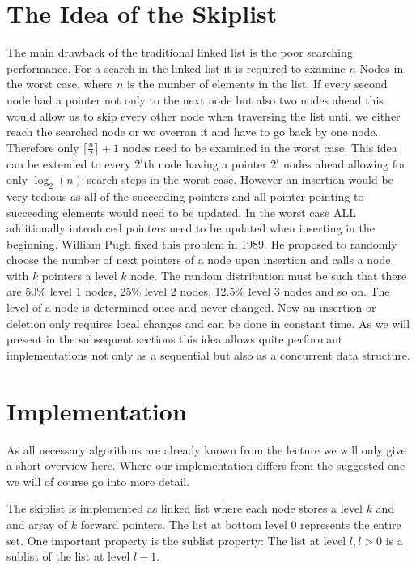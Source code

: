 \documentclass{article}
\begin{document}
\section{The Idea of the Skiplist}
The main drawback of the traditional linked list is the poor searching performance. For a search in the linked list it is required to examine $n$ Nodes in the worst case, where $n$ is the number of elements in the list. If every second node had a pointer not only to the next node but also two nodes ahead this would allow us to skip every other node when traversing the list until we either reach the searched node or we overran it and have to go back by one node. Therefore only \(\lceil \frac{n}{2}\rceil +1 \) nodes need to be examined in the worst case. This idea can be extended to every \(2^i\)th node having a pointer \(2^i\) nodes ahead allowing for only \(\log_2(n)\) search steps in the worst case. However an insertion would be very tedious as all of the succeeding pointers and all pointer pointing to succeeding elements would need to be updated. In the worst case ALL additionally introduced pointers need to be updated when inserting in the beginning. William Pugh fixed this problem in 1989. He proposed to randomly choose the number of next pointers of a node upon insertion and calls a node with $k$ pointers a level $k$ node. The random distribution must be such that there are 50\% level $1$ nodes, 25\% level $2$ nodes, 12.5\% level $3$ nodes and so on. The level of a node is determined once and never changed. Now an insertion or deletion only requires local changes and can be done in constant time. As we will present in the subsequent sections this idea allows quite performant implementations not only as a sequential but also as a concurrent data structure.

\section{Implementation}
As all necessary algorithms are already known from the lecture we will only give a short overview here. Where our implementation differs from the suggested one we will of course go into more detail. \par \medskip
\noindent
The skiplist is implemented as linked list where each node stores a level $k$ and and array of $k$ forward pointers. The list at bottom level 0 represents the entire set. One important property is the sublist property: The list at level $l, l>0$ is a sublist of the list at level $l-1$. 
\end{document}
